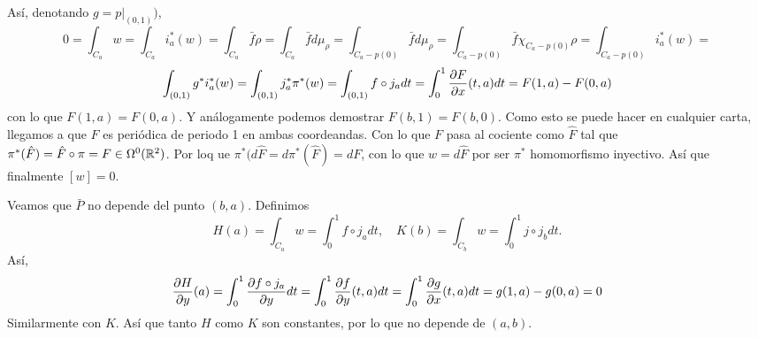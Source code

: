 \documentclass[twoside]{article}
\begin{document}
\begin{solucion}
Así, denotando $g=p|_{(0,1)})$,
\[
0=\int_{C_a}w=\int_{C_a}i_a^*(w)=\int_{C_a}\bar{f}\rho =\int_{C_a} \bar{f}d\mu_{\rho}=\int_{C_a-p(0)} \bar{f}d\mu_{\rho}=\int_{C_a-p(0)}\bar{f}\chi_{C_a-p(0)}\rho=\int_{C_a-p(0)}i_a^*(w)=
\]
\[
\int_{(0,1)} g^*i_a^*(w)=\int_{(0,1)}j_a^*\pi^*(w)=\int_{(0,1)} f\circ j_a dt=\int_0^1\frac{\partial F}{\partial x}(t,a)dt=F(1,a)-F(0,a)
\]
con lo que $F(1,a)=F(0,a)$. Y análogamente podemos demostrar $F(b,1)=F(b,0)$. Como esto se puede hacer en cualquier carta, llegamos a que $F$ es periódica de periodo 1 en ambas coordeandas. Con lo que $F$ pasa al cociente como $\hat{F}$ tal que $\pi^*(\hat{F})=\hat{F}\circ\pi=F\in\Omega^0(\mathbb{R}^2)$. Por loq ue $\pi^*(d\hat{F}=d\pi^*(\hat{F})=dF$, con lo que $w=d\hat{F}$ por ser $\pi^*$ homomorfismo inyectivo. Así que finalmente $[w]=0$.

Veamos que $\bar{P}$ no depende del punto $(b,a)$. Definimos
\[
H(a)=\int_{C_a}w=\int_0^1 f\circ j_a dt,\quad K(b)=\int_{C_b}w=\int_0^1 j\circ j_b dt.
\]
Así, 
\[
\frac{\partial H}{\partial y}(a)=\int_0^1\frac{\partial f\circ j_a}{\partial y}dt=\int_0^1\frac{\partial f}{\partial y}(t,a)dt=\int_0^1\frac{\partial g}{\partial x}(t,a)dt=g(1,a)-g(0,a)=0
\]
Similarmente con $K$. Así que tanto $H$ como $K$ son constantes, por lo que no depende de $(a,b)$.

\end{solucion}
\newpage
\end{document}
